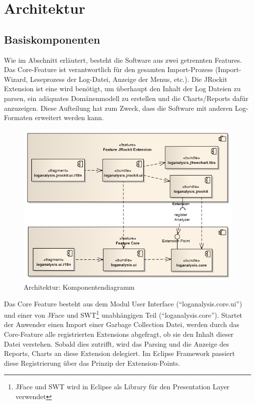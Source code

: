 \section{Architektur}
\subsection{Basiskomponenten}
Wie im Abschnitt  erläutert, besteht die Software aus zwei getrennten Features. Das Core-Feature ist verantwortlich für den gesamten Import-Prozess (Import-Wizard, Leseprozess der Log-Datei, Anzeige der Menus, etc.). Die JRockit Extension ist eine wird benötigt, um überhaupt den Inhalt der Log Dateien zu parsen, ein adäquates Domänenmodell zu erstellen und die Charts/Reports dafür anzuzeigen. Diese Aufteilung hat zum Zweck, dass die Software mit anderen Log-Formaten erweitert werden kann.
 \begin{figure}[H]
  	\centering
        	\caption{Architektur: Komponentendiagramm}
    	\includegraphics[width=15cm]{images/architektur_komponenten_uebersicht}
\end{figure}

Das Core Feature besteht aus dem Modul User Interface (``loganalysis.core.ui'') und einer von JFace und SWT\footnote{JFace und SWT wird in Eclipse als Library für den Presentation Layer verwendet} unabhängigen Teil (``loganalysis.core''). Startet der Anwender einen Import einer Garbage Collection Datei, werden durch das Core-Feature alle registrierten Extensions abgefragt, ob sie den Inhalt dieser Datei verstehen. Sobald dies zutrifft, wird das Parsing und die Anzeige des Reports, Charts an diese Extension delegiert. Im Eclipse Framework passiert diese Registrierung über das Prinzip der Extension-Points.

